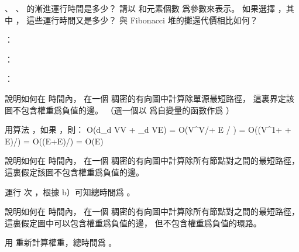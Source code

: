 \startigBase[a]\startitem
{}、 、  的漸進運行時間是多少？
請以  和元素個數  爲參數來表示。
如果選擇 ，其中 ，
這些運行時間又是多少？
與 Fibonacci 堆的攤還代價相比如何？
\stopitem\stopigBase

\startANSWER
{}： 

： 

： 
\stopANSWER

\startigBase[continue]\startitem
說明如何在  時間內，
在一個 \m{\epsilon} 稠密的有向圖中計算除單源最短路徑，
這裏界定該圖不包含權重爲負值的邊。
（\hint 選一個以 \m{\epsilon} 爲自變量的函數作爲 ）
\stopitem\stopigBase

\startANSWER
用算法 ，如果 ，則：
\startformula\startmathalignment
\NC \NC O(d\log_d V\cdot V + \log_d V\cdot E) \NR
\NC = \NC O(V^\epsilon \cdot V/\epsilon + E / \epsilon) \NR
\NC = \NC O((V^{1+\epsilon} + E)/\epsilon) \NR
\NC = \NC O((E+E)/\epsilon) \NR
\NC = \NC O(E) \NR
\stopmathalignment\stopformula
\stopANSWER

\startigBase[continue]\startitem
說明如何在  時間內，
在一個 \m{\epsilon} 稠密的有向圖中計算除所有節點對之間的最短路徑，
這裏假定該圖不包含權重爲負值的邊。
\stopitem\stopigBase

\startANSWER
運行  次 ，根據 b）可知總時間爲 。
\stopANSWER

\startigBase[continue]\startitem
說明如何在  時間內，
在一個 \m{\epsilon} 稠密的有向圖中計算除所有節點對之間的最短路徑，
這裏假定圖中可以包含權重爲負值的邊，
但不包含權重爲負值的環路。
\stopitem\stopigBase

\startANSWER
用  重新計算權重，總時間爲 。
\stopANSWER

\stopPROBLEM

\stopsubject%

